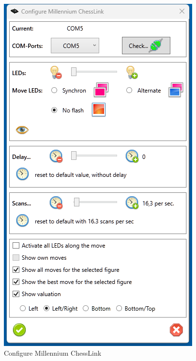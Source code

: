 \documentclass[11pt,a4paper]{article}
\begin{document}
\begin{figure}[H]
	\centering
	\includegraphics[scale=1.0]{MillenniumChessLink2.png}
	\caption{Configure Millennium ChessLink}
	\label{fig:MillenniumChessLink2}
\end{figure}
\end{document}
